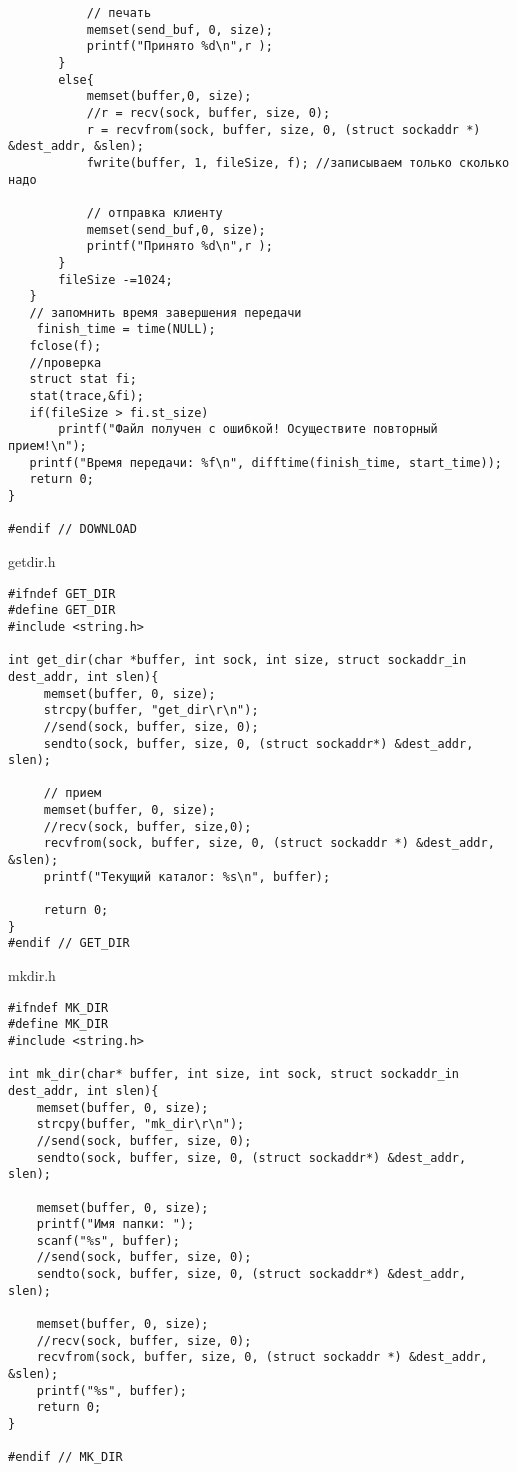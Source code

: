 \documentclass[12pt,a4paper]{report}
\begin{document}
\begin{lstlisting}
           // печать
           memset(send_buf, 0, size);
           printf("Принято %d\n",r );
       }
       else{
           memset(buffer,0, size);
           //r = recv(sock, buffer, size, 0);
		   r = recvfrom(sock, buffer, size, 0, (struct sockaddr *) &dest_addr, &slen);
           fwrite(buffer, 1, fileSize, f); //записываем только сколько надо

           // отправка клиенту
           memset(send_buf,0, size);
           printf("Принято %d\n",r );
       }
       fileSize -=1024;
   }
   // запомнить время завершeния передачи
	finish_time = time(NULL);
   fclose(f);
   //проверка
   struct stat fi;
   stat(trace,&fi);
   if(fileSize > fi.st_size)
	   printf("Файл получен с ошибкой! Осуществите повторный прием!\n");
   printf("Время передачи: %f\n", difftime(finish_time, start_time));
   return 0;
}

#endif // DOWNLOAD
\end{lstlisting}

getdir.h
\begin{lstlisting}
#ifndef GET_DIR
#define GET_DIR
#include <string.h>

int get_dir(char *buffer, int sock, int size, struct sockaddr_in dest_addr, int slen){
     memset(buffer, 0, size);
     strcpy(buffer, "get_dir\r\n");
     //send(sock, buffer, size, 0);
	 sendto(sock, buffer, size, 0, (struct sockaddr*) &dest_addr, slen);

     // прием
     memset(buffer, 0, size);
     //recv(sock, buffer, size,0);
	 recvfrom(sock, buffer, size, 0, (struct sockaddr *) &dest_addr, &slen);
     printf("Текущий каталог: %s\n", buffer);

     return 0;
}
#endif // GET_DIR
\end{lstlisting}

mkdir.h
\begin{lstlisting}
#ifndef MK_DIR
#define MK_DIR
#include <string.h>

int mk_dir(char* buffer, int size, int sock, struct sockaddr_in dest_addr, int slen){
    memset(buffer, 0, size);
    strcpy(buffer, "mk_dir\r\n");
    //send(sock, buffer, size, 0);
	sendto(sock, buffer, size, 0, (struct sockaddr*) &dest_addr, slen);

    memset(buffer, 0, size);
    printf("Имя папки: ");
    scanf("%s", buffer);
    //send(sock, buffer, size, 0);
	sendto(sock, buffer, size, 0, (struct sockaddr*) &dest_addr, slen);

    memset(buffer, 0, size);
    //recv(sock, buffer, size, 0);
	recvfrom(sock, buffer, size, 0, (struct sockaddr *) &dest_addr, &slen);
    printf("%s", buffer);
    return 0;
}

#endif // MK_DIR
\end{lstlisting}
\end{document}
